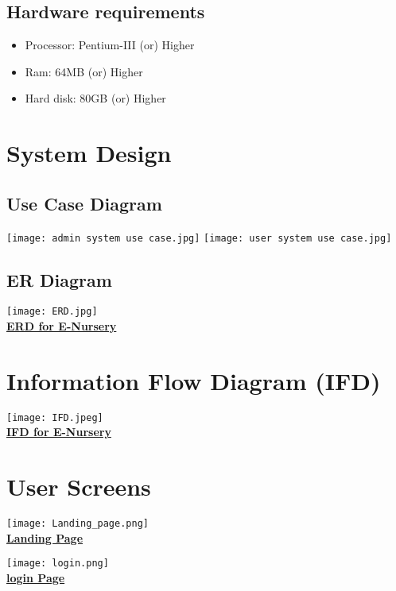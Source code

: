 \documentclass[12pt,a4paper]{report}
\begin{document}
		\section{Hardware requirements}
		\begin{itemize}
			\item Processor: Pentium-III (or) Higher
			\item Ram: 64MB (or) Higher
			\item Hard disk: 80GB (or) Higher
		\end{itemize}
								  
		\chapter{System Design}
		\section{Use Case Diagram}
		\begin{center}
			\texttt{[image: admin system use case.jpg]}
			\texttt{[image: user system use case.jpg]}
		\end{center}
		\section{ER Diagram}
		\begin{center} 
			\texttt{[image: ERD.jpg]}
			\\
			\textbf{\underline{ERD for E-Nursery}}   
		\end{center}
		\chapter{Information Flow Diagram (IFD)}
		\begin{center} 
			\texttt{[image: IFD.jpeg]}
			\\
			\textbf{\underline{IFD for E-Nursery}}   
		\end{center}
								
		\chapter{User Screens}
		\begin{center} 
			\texttt{[image: Landing\_page.png]}
			\\
			\textbf{\underline{Landing Page}}   
		\end{center}
				  
		\begin{center}
			\texttt{[image: login.png]}
			\\
			\textbf{\underline{login Page}}
		\end{center}
				  
\end{document}
